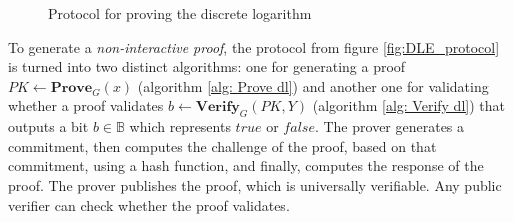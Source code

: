 \begin{figure}[h]
    \centering
    \caption{Protocol for proving the discrete logarithm}
\end{figure}

To generate a \textit{non-interactive proof}, the protocol from figure \ref{fig:DLE_protocol} is turned into two distinct algorithms: one for generating a proof \( PK \leftarrow \mathbf{Prove}_G (x) \) (algorithm \ref{alg: Prove dl}) and another one for validating whether a proof validates \( b \leftarrow \mathbf{Verify}_G (PK, Y) \) (algorithm \ref{alg: Verify dl}) that outputs a bit \( b \in \mathbb{B} \) which represents $true$ or $false$. The prover generates a commitment, then computes the challenge of the proof, based on that commitment, using a hash function, and finally, computes the response of the proof. The prover publishes the proof, which is universally verifiable. Any public verifier can check whether the proof validates.

